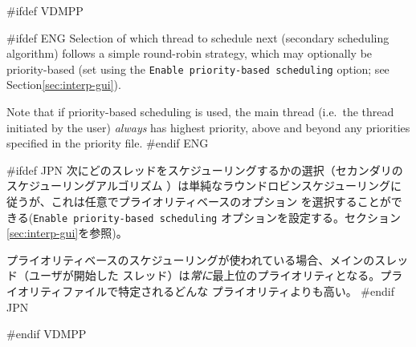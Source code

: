 \documentclass[\pformat,12pt]{article}
\newcommand{\vdmslpp}{VDM-SL}
\newcommand{\Toolbox}{Toolbox}
\newcommand{\vdmslpp}{VDM++}
\newcommand{\Toolbox}{Toolbox}
\newcommand{\guicmd}[1]{{\sf #1}}
\newcommand{\guicmd}[1]{{\gt #1}}
\begin{document}
#ifdef VDMPP

#ifdef ENG
Selection of which thread to schedule next (secondary scheduling
algorithm) follows a simple round-robin strategy, which may optionally
be priority-based (set using the \texttt{Enable priority-based
  scheduling} option; see Section\ref{sec:interp-gui}).

Note that if priority-based scheduling is used, the main thread
(i.e.\ the thread initiated by the user) \textit{always} has highest
priority, above and beyond any priorities specified in the priority
file.
#endif ENG

#ifdef JPN
次にどのスレッドをスケジューリングするかの選択（セカンダリのスケジューリングアルゴリズム
）は単純なラウンドロビンスケジューリングに従うが、これは任意でプライオリティベースのオプション
を選択することができる(\texttt{Enable priority-based
  scheduling} オプションを設定する。セクション\ref{sec:interp-gui}を参照)。

プライオリティベースのスケジューリングが使われている場合、メインのスレッド（ユーザが開始した
スレッド）は\textit{常に}最上位のプライオリティとなる。プライオリティファイルで特定されるどんな
プライオリティよりも高い。 
#endif JPN

#endif VDMPP


% 
%


\end{document}
